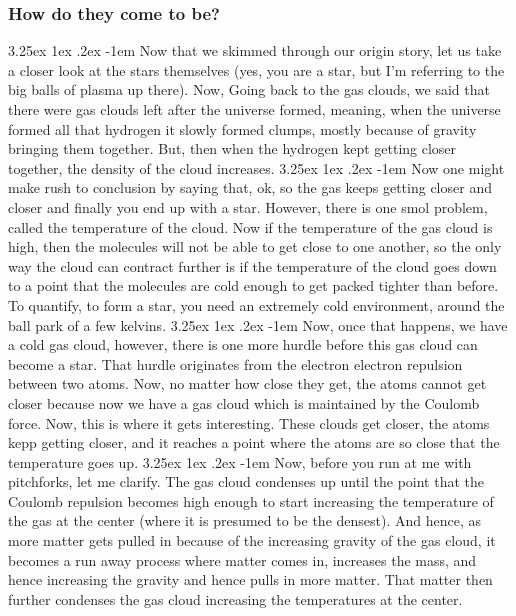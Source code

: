 \documentclass[a4paper,twoside,11pt]{article}
\makeatletter
\numberwithin{equation}{section}
\renewcommand\paragraph{\@startsection{paragraph}{5}{\z@}%
  {3.25ex \@plus1ex \@minus.2ex}%
  {-1em}%
  {\normalfont\normalsize\bfseries}}
\makeatother
\begin{document}
\subsubsection{How do they come to be?}
\paragraph{}
Now that we skimmed through our origin story, let us take a closer look at the stars themselves (yes, you are a star, but I'm referring to the big balls of plasma up there). Now, Going back to the gas clouds, we said that there were gas clouds left after the universe formed, meaning, when the universe formed all that hydrogen it slowly formed clumps, mostly because of gravity bringing them together. But, then when the hydrogen kept getting closer together, the density of the cloud increases.
\paragraph{}
Now one might make rush to conclusion by saying that, ok, so the gas keeps getting closer and closer and finally you end up with a star. However, there is one smol problem, called the temperature of the cloud. Now if the temperature of the gas cloud is high, then the molecules will not be able to get close to one another, so the only way the cloud can contract further is if the temperature of the cloud goes down to a point that the molecules are cold enough to get packed tighter than before. To quantify, to form a star, you need an extremely cold environment, around the ball park of a few kelvins. 
\paragraph{}
Now, once that happens, we have a cold gas cloud, however, there is one more hurdle before this gas cloud can become a star. That hurdle originates from the electron electron repulsion between two atoms. Now, no matter how close they get, the atoms cannot get closer because now we have a gas cloud which is maintained by the Coulomb force. Now, this is where it gets interesting. These clouds get closer, the atoms kepp getting closer, and it reaches a point where the atoms are so close that the temperature goes up. 
\paragraph{}
Now, before you run at me with pitchforks, let me clarify. The gas cloud condenses up until the point that the Coulomb repulsion becomes high enough to start increasing the temperature of the gas at the center (where it is presumed to be the densest). And hence, as more matter gets pulled in because of the increasing gravity of the gas cloud, it becomes a run away process where matter comes in, increases the mass, and hence increasing the gravity and hence pulls in more matter. That matter then further condenses the gas cloud increasing the temperatures at the center. 
\end{document}
